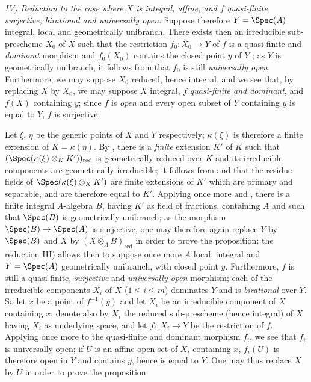\emph{IV) Reduction to the case where $X$ is integral, affine, and $f$ quasi-finite, surjective, birational and universally open.}
Suppose therefore $Y=\Spec(A)$ integral, local and geometrically unibranch.
There exists then an irreducible sub-prescheme $X_0$ of $X$ such that the restriction $f_0:X_0\to Y$ of $f$ is a quasi-finite and \emph{dominant} morphism and $f_0(X_0)$ contains the closed point $y$ of $Y$ ; as $Y$ is geometrically unibranch, it follows from  that $f_0$ is still \emph{universally open}.
Furthermore, we may suppose $X_0$ reduced, hence integral, and we see that, by replacing $X$ by $X_0$, we may suppose $X$ integral, $f$ \emph{quasi-finite and dominant}, and $f(X)$ containing $y$; since $f$ is \emph{open} and every open subset of $Y$ containing $y$ is equal to $Y$, $f$ is surjective.

Let $\xi$, $\eta$ be the generic points of $X$ and $Y$ respectively; $\kappa(\xi)$ is therefore a finite extension of $K=\kappa(\eta)$.
By , there is a \emph{finite} extension $K'$ of $K$ such that $(\Spec(\kappa(\xi)\otimes_K K'))_{\mathrm{red}}$ is geometrically reduced over $K$ and its irreducible components are geometrically irreducible; it follows from  and  that the residue fields of $\Spec(\kappa(\xi)\otimes_K K')$ are finite extensions of $K'$ which are primary and separable, and are therefore equal to $K'$.
Applying once more  and , there is a finite integral $A$-algebra $B$, having $K'$ as field of fractions, containing $A$ and such that $\Spec(B)$ is geometrically unibranch; as the morphism $\Spec(B)\to\Spec(A)$ is surjective, one may therefore again replace $Y$ by $\Spec(B)$ and $X$ by $(X\otimes_A B)_{\mathrm{red}}$ in order to prove the proposition; the reduction III) allows then to suppose once more $A$ local, integral and $Y=\Spec(A)$ geometrically unibranch, with closed point $y$.
Furthermore, $f$ is still a quasi-finite, \emph{surjective} and \emph{universally open} morphism; each of the irreducible components $X_i$ of $X$ ($1\leq i\leq m$) dominates $Y$  and is \emph{birational} over $Y$.
So let $x$ be a point of $f^{-1}(y)$ and let $X_i$ be an irreducible component of $X$ containing $x$; denote also by $X_i$ the reduced sub-prescheme (hence integral) of $X$ having $X_i$ as underlying space, and let $f_i:X_i\to Y$ be the restriction of $f$.
Applying once more  to the quasi-finite and dominant morphism $f_i$, we see that $f_i$ is universally open; if $U$ is an affine open set of $X_i$ containing $x$, $f_i(U)$ is therefore
open in $Y$ and contains $y$, hence is equal to $Y$.
One may thus replace $X$ by $U$ in order to prove the proposition.

